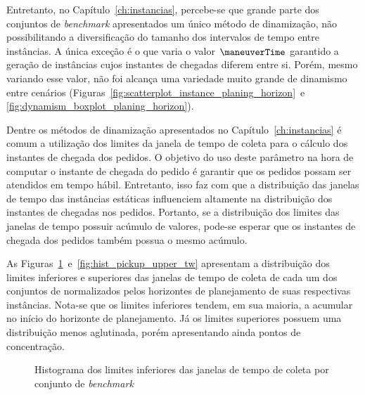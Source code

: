Entretanto, no Capítulo~\ref{ch:instancias}, percebe-se que grande parte dos 
conjuntos de \textit{benchmark} apresentados um único método de 
dinamização, não possibilitando a diversificação do tamanho dos intervalos de 
tempo entre instâncias.
A única exceção é o  que varia o valor 
$\maneuverTime$ garantido a geração de instâncias cujos instantes de chegadas 
diferem entre si.
Porém, mesmo variando esse valor, não foi alcança uma variedade muito grande de
dinamismo entre cenários 
(Figuras~\ref{fig:scatterplot_instance_planing_horizon}~e
\ref{fig:dynamism_boxplot_planing_horizon}).

Dentre os métodos de dinamização apresentados no Capítulo~\ref{ch:instancias} é 
comum a utilização dos limites da janela de tempo de coleta para o cálculo dos 
instantes de chegada dos pedidos.
O objetivo do uso deste parâmetro na hora de computar o instante de chegada do 
pedido é garantir que os pedidos possam ser atendidos em tempo hábil.
Entretanto, isso faz com que a distribuição das janelas de tempo das instâncias
estáticas influenciem altamente na distribuição dos instantes de chegadas nos 
pedidos.
Portanto, se a distribuição dos limites das janelas de tempo possuir acúmulo 
de valores, pode-se esperar que os instantes de chegada dos pedidos também  
possua o mesmo acúmulo.


As Figuras~\ref{fig:hist_pickup_lower_tw}~e~\ref{fig:hist_pickup_upper_tw} 
apresentam a distribuição dos limites inferiores e superiores das janelas de 
tempo de coleta de cada um dos conjuntos de  normalizados 
pelos horizontes de planejamento de suas respectivas instâncias.
Nota-se que os limites inferiores tendem, em sua maioria, a acumular no início 
do horizonte de planejamento.
Já os limites superiores possuem uma distribuição menos aglutinada, 
porém apresentando ainda pontos de concentração.

\begin{figure}[h]
    \centering
    \caption{Histograma dos limites inferiores das janelas de tempo 
             de coleta por conjunto de \textit{benchmark}}
    \label{fig:hist_pickup_lower_tw}
\end{figure}

